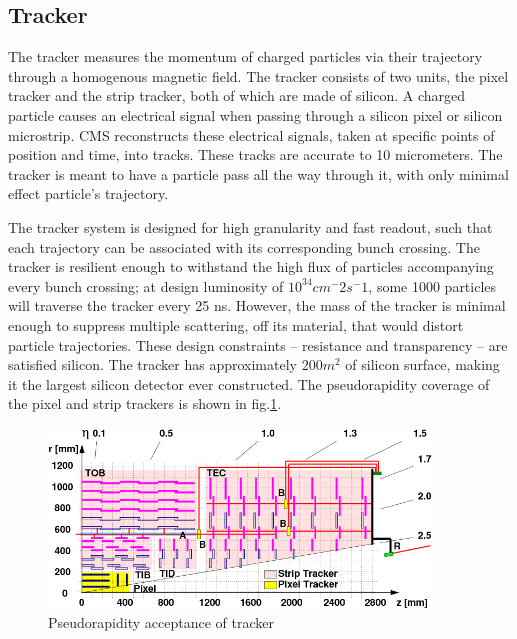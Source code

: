 \subsection{Tracker}

The tracker measures the momentum of charged particles via their trajectory through a homogenous magnetic field. The tracker consists of two units, the pixel tracker and the strip tracker, both of which are made of silicon. A charged particle causes an electrical signal when passing through a silicon pixel or silicon microstrip. CMS reconstructs these electrical signals, taken at specific points of position and time, into tracks. These tracks are accurate to 10 micrometers. The tracker is meant to have  a particle pass all the way through it, with only minimal effect particle's trajectory. 

The tracker system is designed for high granularity and fast readout, such that each trajectory can be associated with its corresponding bunch crossing. The tracker is resilient enough to withstand the high flux of particles accompanying every bunch crossing; at design luminosity of $10^34 cm^-2 s^-1$, some 1000 particles will traverse the tracker every 25 ns. However, the mass of the tracker is minimal enough to suppress multiple scattering, off its material, that would distort particle trajectories. These design constraints -- resistance and transparency -- are satisfied silicon. The tracker has approximately $200 m^2$ of silicon surface, making it the largest silicon detector ever constructed. The pseudorapidity coverage of the pixel and strip trackers is shown in fig.\ref{fig:trackerYZ}.

\begin{figure}[h!]
\begin{centering}
\includegraphics[width=4in]{Chapter3/importfigs/cms_cft_09_003_fig1.png}
\par\end{centering}
\caption{Pseudorapidity acceptance of tracker \label{fig:trackerYZ}}
\end{figure}

